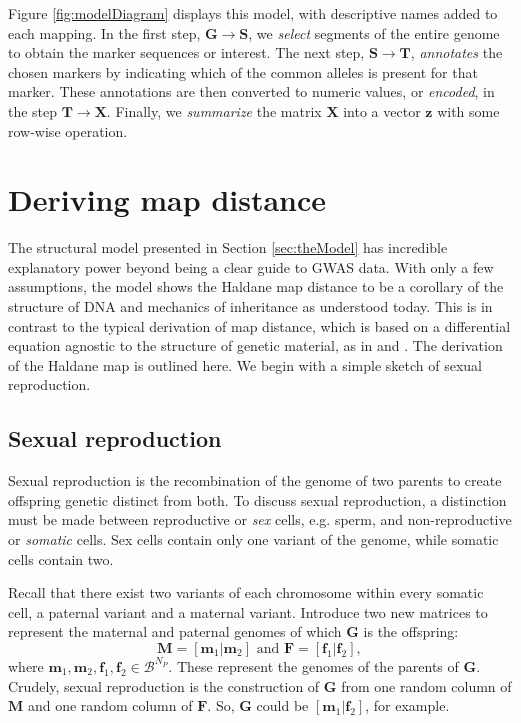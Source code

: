 \documentclass{article}
\newcommand{\ve}[1]{\mathbf{#1}}           %
\newcommand{\m}[1]{\mathbf{#1}}               %
\begin{document}
Figure \ref{fig:modelDiagram} displays this model, with descriptive names added to each mapping. In the first step, $\m{G} \rightarrow \m{S}$, we \textit{select} segments of the entire genome to obtain the marker sequences or interest. The next step, $\m{S} \rightarrow \m{T}$, \textit{annotates} the chosen markers by indicating which of the common alleles is present for that marker. These annotations are then converted to numeric values, or \textit{encoded}, in the step $\m{T} \rightarrow \m{X}$. Finally, we \textit{summarize} the matrix $\m{X}$ into a vector $\ve{z}$ with some row-wise operation.

\section{Deriving map distance} \label{sec:derivingDists}

The structural model presented in Section \ref{sec:theModel} has incredible explanatory power beyond being a clear guide to GWAS data. With only a few assumptions, the model shows the Haldane map distance to be a corollary of the structure of DNA and mechanics of inheritance as understood today. This is in contrast to the typical derivation of map distance, which is based on a differential equation agnostic to the structure of genetic material, as in \cite{kosambi1943estimation} and \cite{xu2013principles}. The derivation of the Haldane map is outlined here. We begin with a simple sketch of sexual reproduction.

\subsection{Sexual reproduction} \label{subsec:crossingover}


Sexual reproduction is the recombination of the genome of two parents to create offspring genetic distinct from both. To discuss sexual reproduction, a distinction must be made between reproductive or \emph{sex} cells, e.g. sperm, and non-reproductive or \emph{somatic} cells. Sex cells contain only one variant of the genome, while somatic cells contain two.

Recall that there exist two variants of each chromosome within every somatic cell, a paternal variant and a maternal variant. Introduce two new matrices to represent the maternal and paternal genomes of which $\m{G}$ is the offspring:
$$\m{M} = [\ve{m}_1| \ve{m}_2] \text{ and } \m{F} = [\ve{f}_1| \ve{f}_2],$$
where $\ve{m}_1, \ve{m}_2, \ve{f}_1, \ve{f}_2 \in \mathcal{B}^{N_P}$. These represent the genomes of the parents of $\m{G}$. Crudely, sexual reproduction is the construction of $\m{G}$ from one random column of $\m{M}$ and one random column of $\m{F}$. So, $\m{G}$ could be $[\ve{m}_1 | \ve{f}_2]$, for example.
\end{document}
